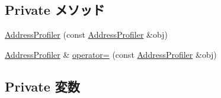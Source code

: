 \subsection*{Private メソッド}
\begin{DoxyCompactItemize}
\item 
\hyperlink{classAddressProfiler_a34e17be12a9b21c77a0705bd32e8b453}{AddressProfiler} (const \hyperlink{classAddressProfiler}{AddressProfiler} \&obj)
\item 
\hyperlink{classAddressProfiler}{AddressProfiler} \& \hyperlink{classAddressProfiler_a0473a7090f98a61e75343ebc48ae55f0}{operator=} (const \hyperlink{classAddressProfiler}{AddressProfiler} \&obj)
\end{DoxyCompactItemize}
\subsection*{Private 変数}

